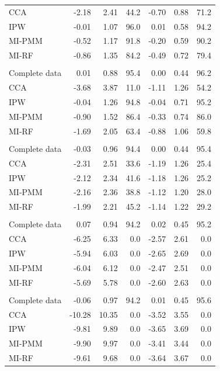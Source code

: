 \documentclass[11pt,a4paper]{article}
\begin{document}
\begin{longtable}{l|rrrrrr}
CCA & -2.18 & 2.41 & 44.2 & -0.70 & 0.88 & 71.2 \\ 
IPW & -0.01 & 1.07 & 96.0 & 0.01 & 0.58 & 94.2 \\ 
MI-PMM & -0.52 & 1.17 & 91.8 & -0.20 & 0.59 & 90.2 \\ 
MI-RF & -0.86 & 1.35 & 84.2 & -0.49 & 0.72 & 79.4 \\ 
\midrule\addlinespace[2.5pt]
\multicolumn{7}{l}{MAR-strong, 50\% missing} \\[2.5pt] 
\midrule\addlinespace[2.5pt]
Complete data & 0.01 & 0.88 & 95.4 & 0.00 & 0.44 & 96.2 \\ 
CCA & -3.68 & 3.87 & 11.0 & -1.11 & 1.26 & 54.2 \\ 
IPW & -0.04 & 1.26 & 94.8 & -0.04 & 0.71 & 95.2 \\ 
MI-PMM & -0.90 & 1.52 & 86.4 & -0.33 & 0.74 & 86.0 \\ 
MI-RF & -1.69 & 2.05 & 63.4 & -0.88 & 1.06 & 59.8 \\ 
\midrule\addlinespace[2.5pt]
\multicolumn{7}{l}{MNAR, 10\% missing} \\[2.5pt] 
\midrule\addlinespace[2.5pt]
Complete data & -0.03 & 0.96 & 94.4 & 0.00 & 0.44 & 95.4 \\ 
CCA & -2.31 & 2.51 & 33.6 & -1.19 & 1.26 & 25.4 \\ 
IPW & -2.12 & 2.34 & 41.6 & -1.18 & 1.26 & 25.2 \\ 
MI-PMM & -2.16 & 2.36 & 38.8 & -1.12 & 1.20 & 28.0 \\ 
MI-RF & -1.99 & 2.21 & 45.2 & -1.14 & 1.22 & 29.2 \\ 
\midrule\addlinespace[2.5pt]
\multicolumn{7}{l}{MNAR, 30\% missing} \\[2.5pt] 
\midrule\addlinespace[2.5pt]
Complete data & 0.07 & 0.94 & 94.2 & 0.02 & 0.45 & 95.2 \\ 
CCA & -6.25 & 6.33 & 0.0 & -2.57 & 2.61 & 0.0 \\ 
IPW & -5.94 & 6.03 & 0.0 & -2.65 & 2.69 & 0.0 \\ 
MI-PMM & -6.04 & 6.12 & 0.0 & -2.47 & 2.51 & 0.0 \\ 
MI-RF & -5.69 & 5.78 & 0.0 & -2.60 & 2.63 & 0.0 \\ 
\midrule\addlinespace[2.5pt]
\multicolumn{7}{l}{MNAR, 50\% missing} \\[2.5pt] 
\midrule\addlinespace[2.5pt]
Complete data & -0.06 & 0.97 & 94.2 & 0.01 & 0.45 & 95.6 \\ 
CCA & -10.28 & 10.35 & 0.0 & -3.52 & 3.55 & 0.0 \\ 
IPW & -9.81 & 9.89 & 0.0 & -3.65 & 3.69 & 0.0 \\ 
MI-PMM & -9.90 & 9.97 & 0.0 & -3.41 & 3.44 & 0.0 \\ 
MI-RF & -9.61 & 9.68 & 0.0 & -3.64 & 3.67 & 0.0 \\ 
\bottomrule
\end{longtable}
\end{document}
